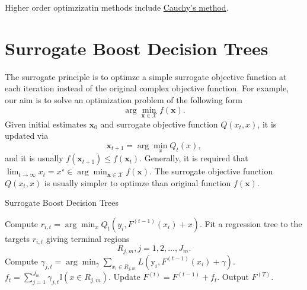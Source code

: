\documentclass[UTF8]{article}
\begin{document}
Higher order optimzizatin methods include \href{https://dl.acm.org/citation.cfm?id=2643338}{Cauchy’s method}.
\section{Surrogate Boost Decision Trees}

The surrogate principle is to optimze a simple surrogate objective function  at each iteration 
instead of the original complex objective function.
For example, our aim is to solve an optimization problem of the following form
\begin{equation}\label{eq:fw_objective}
  \arg\min_{\boldsymbol{x} \in \mathcal{X}} f(\boldsymbol{x}).
\end{equation}
Given initial estimates $\boldsymbol{x}_0$ and surrogate objective function $Q(x_t, x)$,
it is updated via 
$$\boldsymbol{x}_{t+1}=\arg\min_{x}Q_t(x),$$
and it is usually $f(\boldsymbol{x}_{t+1})\leq f(\boldsymbol{x}_t)$.
Generally, it is required that $\lim_{t\to\infty}{x}_{t}=x^{\star}\in \arg\min_{\boldsymbol{x} \in \mathcal{X}} f(\boldsymbol{x})$.
The surrogate objective function $Q(x_t, x)$ is usually simpler to optimze than original function
$f(\boldsymbol{x})$.

\begin{algorithm}[h]
  \caption{Surrogate Boost Decision Trees}
  \begin{algorithmic}[1]
  \STATE Compute $r_{i,t}=\arg\min_{x}Q_t(y_i,F^{(t-1)}(x_i)+x)$.
  \ENDFOR
  \STATE  Fit a regression tree to the targets $r_{i,t}$ giving terminal regions
     $$R_{j,m}, j = 1, 2,\dots , J_m. $$
  \STATE Compute $\gamma_{j,t}=\arg\min_{\gamma}\sum_{x_i\in R_{j,m}}{L(\mathrm{y}_i, F^{(t-1)}(x_i)+\gamma)}$.
  \ENDFOR
  \STATE $f_t={\sum}_{j=1}^{J_m}{\gamma}_{j, t} \mathbb{I}(x\in R_{j, m})$.
  \STATE Update $F^{(t)} = F^{(t-1)}+f_t$.
  \ENDFOR
  \STATE Output $F^{(T)}$.
  \end{algorithmic}
\end{algorithm}
\end{document}
